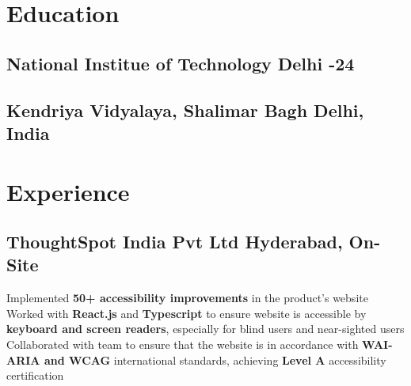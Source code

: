 \documentclass[]{Nikhil_Kadiyan_Resume}
\begin{document}

\descript{}

\section{Education}
\hrulefill

\subsection{National Institue of Technology Delhi \hfill {}-24}

\sectionsep

\subsection{Kendriya Vidyalaya, Shalimar Bagh \hfill \normalfont Delhi, India}

\sectionsep

\section{Experience} 
\hrulefill

\subsection{ThoughtSpot India Pvt Ltd \hfill \normalfont Hyderabad, On-Site}
\pt Implemented \textbf{50+ accessibility improvements} in the product's website\\
\pt Worked with \textbf{React.js} and \textbf{Typescript} to ensure website is accessible by \textbf{keyboard and screen readers}, especially for blind users and near-sighted users\\
\pt Collaborated with team to ensure that the website is in accordance with \textbf{WAI-ARIA and WCAG} international standards, achieving \textbf{Level A}  accessibility certification\\
\sectionsep
\end{document}
